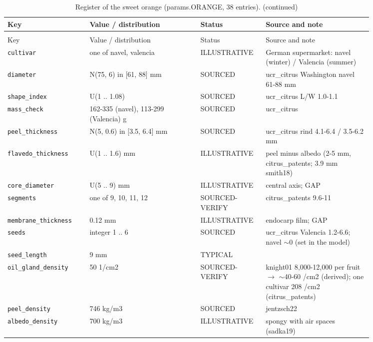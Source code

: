 \documentclass[10.5pt,a4paper]{article}
\begin{document}
{\scriptsize\begin{longtable}{@{}p{0.2\linewidth}p{0.27\linewidth}p{0.12\linewidth}p{0.26\linewidth}@{}}\caption{Register of the sweet orange (params.ORANGE, 38 entries).}\\\toprule Key & Value / distribution & Status & Source and note \\\midrule\endfirsthead
\caption[]{Register of the sweet orange (params.ORANGE, 38 entries). (continued)}\\\toprule Key & Value / distribution & Status & Source and note \\\midrule\endhead
\texttt{cultivar} & one of navel, valencia & ILLUSTRATIVE & German supermarket: navel (winter) / Valencia (summer) \\
\texttt{diameter} & N(75, 6) in [61, 88] mm & SOURCED & ucr\_citrus Washington navel 61-88 mm \\
\texttt{shape\_\allowbreak{}index} & U(1 .. 1.08) & SOURCED & ucr\_citrus L/W 1.0-1.1 \\
\texttt{mass\_\allowbreak{}check} & 162-335 (navel), 113-299 (Valencia) g & SOURCED & ucr\_citrus \\
\texttt{peel\_\allowbreak{}thickness} & N(5, 0.6) in [3.5, 6.4] mm & SOURCED & ucr\_citrus rind 4.1-6.4 / 3.5-6.2 mm \\
\texttt{flavedo\_\allowbreak{}thickness} & U(1 .. 1.6) mm & ILLUSTRATIVE & peel minus albedo (2-5 mm, citrus\_patents; 3.9 mm smith18) \\
\texttt{core\_\allowbreak{}diameter} & U(5 .. 9) mm & ILLUSTRATIVE & central axis; GAP \\
\texttt{segments} & one of 9, 10, 11, 12 & SOURCED-VERIFY & citrus\_patents 9.6-11 \\
\texttt{membrane\_\allowbreak{}thickness} & 0.12 mm & ILLUSTRATIVE & endocarp film; GAP \\
\texttt{seeds} & integer 1 .. 6 & SOURCED & ucr\_citrus Valencia 1.2-6.6; navel $\sim$0 (set in the model) \\
\texttt{seed\_\allowbreak{}length} & 9 mm & TYPICAL &  \\
\texttt{oil\_\allowbreak{}gland\_\allowbreak{}density} & 50 1/cm2 & SOURCED-VERIFY & knight01 8,000-12,000 per fruit $\to$ $\sim$40-60 /cm2 (derived); one cultivar 208 /cm2 (citrus\_patents) \\
\texttt{peel\_\allowbreak{}density} & 746 kg/m3 & SOURCED & jentzsch22 \\
\texttt{albedo\_\allowbreak{}density} & 700 kg/m3 & ILLUSTRATIVE & spongy with air spaces (sadka19) \\

\end{longtable}}
\end{document}
